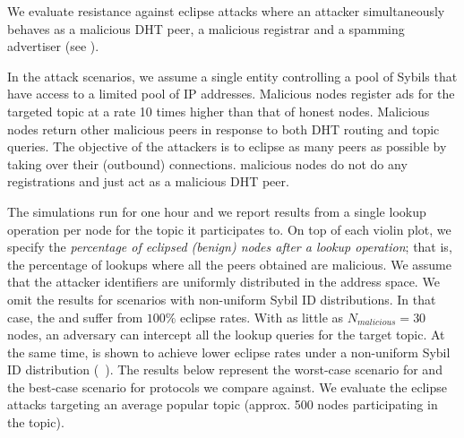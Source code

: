 

We evaluate \sysname resistance against eclipse attacks where an attacker simultaneously behaves as a malicious DHT peer, a malicious registrar and a spamming advertiser (see ). 

In the attack scenarios, we assume a single entity controlling a pool of Sybils that have access to a limited pool of IP addresses. 
Malicious nodes register ads for the targeted topic at a rate 10 times higher than that of honest nodes.  Malicious nodes return other malicious peers in response to both DHT routing and topic queries. The objective of the attackers is to eclipse as many peers as possible by taking over their (outbound) connections.
\discv malicious nodes do not do any registrations and just act as a malicious DHT peer.

The simulations run for one hour and we report results from a single lookup operation per node for the topic it participates to. On top of each violin plot, we specify the \emph{percentage of eclipsed (benign) nodes after a lookup operation}; that is, the percentage of lookups where all the peers obtained are malicious. We assume that the attacker identifiers are uniformly distributed in the address space. We omit the results for scenarios with non-uniform Sybil ID distributions. In that case, the \altname and \altnameticket suffer from $100\%$ eclipse rates.  With as little as $N_{malicious} = 30$ nodes, an adversary can intercept all the lookup queries for the target topic. At the same time, \sysname is shown to achieve lower eclipse rates under a non-uniform Sybil ID distribution (~). The results below represent the worst-case scenario for \sysname and the best-case scenario for protocols we compare against. 
We evaluate the eclipse attacks targeting an average popular topic (approx.  500 nodes participating in the topic). 


